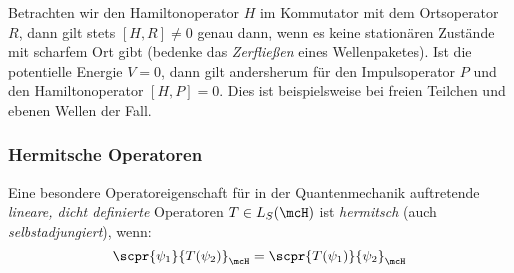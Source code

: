 \documentclass{subfiles}
\begin{document}
            Betrachten wir den Hamiltonoperator $H$ im Kommutator mit dem Ortsoperator $R$, dann gilt stets $[H,R]\neq 0$ genau dann, wenn es keine stationären Zustände mit scharfem Ort gibt (bedenke das \emph{Zerfließen} eines Wellenpaketes). Ist die potentielle Energie $V=0$, dann gilt andersherum für den Impulsoperator $P$ und den Hamiltonoperator $[H,P] = 0$. Dies ist beispielsweise bei freien Teilchen und ebenen Wellen der Fall. 

        \subsubsection*{Hermitsche Operatoren}
            Eine besondere Operatoreigenschaft für in der Quantenmechanik auftretende \emph{lineare, dicht definierte} Operatoren $T\in L_S(\mcH)$ ist \emph{hermitsch} (auch \emph{selbstadjungiert}), wenn:
            \[\scpr{\psi_1}{T(\psi_2)}_{\mcH} = \scpr{T(\psi_1)}{\psi_2}_{\mcH}\]
\end{document}
